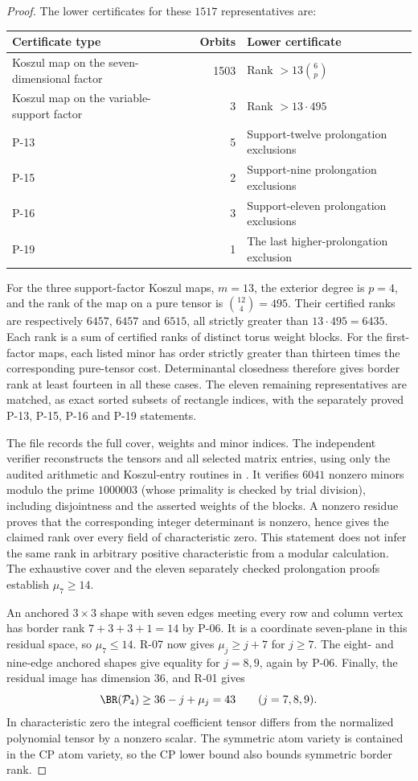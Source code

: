 \begin{proof}
The lower certificates for these $1517$ representatives are:
\begin{center}
\begin{tabular}{l|r|l}
Certificate type&Orbits&Lower certificate\\\hline
Koszul map on the seven-dimensional factor&1503&Rank $>13\binom6p$\\
Koszul map on the variable-support factor&3&Rank $>13\cdot495$\\
P-13&5&Support-twelve prolongation exclusions\\
P-15&2&Support-nine prolongation exclusions\\
P-16&3&Support-eleven prolongation exclusions\\
P-19&1&The last higher-prolongation exclusion
\end{tabular}
\end{center}
For the three support-factor Koszul maps, $m=13$, the exterior
degree is $p=4$, and the rank of the map on a pure tensor is
$\binom{12}{4}=495$. Their certified ranks are respectively
$6457$, $6457$ and $6515$, all strictly greater than
$13\cdot495=6435$. Each rank is a sum of certified ranks of
distinct torus weight blocks. For the first-factor maps, each
listed minor has order strictly greater than thirteen times
the corresponding pure-tensor cost. Determinantal closedness
therefore gives border rank at least fourteen in all these cases.
The eleven remaining representatives are matched, as exact
sorted subsets of rectangle indices, with the separately proved
P-13, P-15, P-16 and P-19 statements.

The file  records the full
cover, weights and minor indices. The independent verifier
 reconstructs the tensors and all
selected matrix entries, using only the audited arithmetic and
Koszul-entry routines in .
It verifies $6041$ nonzero minors modulo the prime $1000003$
(whose primality is checked by trial division), including
disjointness and the asserted weights of the blocks. A nonzero
residue proves that the corresponding integer determinant is
nonzero, hence gives the claimed rank over every field of
characteristic zero. This statement does not infer the same
rank in arbitrary positive characteristic from a modular
calculation. The exhaustive cover and the eleven separately
checked prolongation proofs establish $\mu_7\geq14$.

An anchored $3\times3$ shape with seven edges meeting every
row and column vertex has border rank $7+3+3+1=14$ by P-06.
It is a coordinate seven-plane in this residual space, so
$\mu_7\leq14$. R-07 now gives $\mu_j\geq j+7$ for $j\geq7$.
The eight- and nine-edge anchored shapes give equality for
$j=8,9$, again by P-06. Finally, the residual image has
dimension $36$, and R-01 gives
\[
 \BR(\mathcal P_4)\geq36-j+\mu_j=43\qquad(j=7,8,9).
\]
In characteristic zero the integral coefficient tensor differs
from the normalized polynomial tensor by a nonzero scalar.
The symmetric atom variety is contained in the CP atom variety,
so the CP lower bound also bounds symmetric border rank.
\end{proof}

